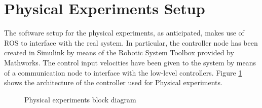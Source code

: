 \section{Physical Experiments Setup}
The software setup for the physical experiments, as anticipated, makes use of ROS to interface with the real system. In particular, the controller node has been created in Simulink by means of the Robotic System Toolbox provided by Mathworks. The control input velocities have been given to the system by means of a communication node to interface with the low-level controllers. Figure \ref{diagramreal} shows the architecture of the controller used for Physical experiments.
\begin{figure}[h!]

	\centering
	
	\caption{Physical experiments block diagram} 

\label{diagramreal}
\end{figure}


